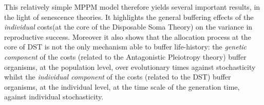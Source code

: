 \documentclass[10pt,a4paper]{article}
\newcommand{\PCoR}{\emph{individual} costs}
\begin{document}
This relatively simple MPPM model therefore yields several important results, in the light of senescence theories. It highlights the general buffering effects of the \PCoR (at the core of the Disposable Soma Theory) on the variance in reproductive success. Moreover it also shows that the allocation process at the core of DST is not the only mechanism able to buffer life-history: 
the \emph{genetic component} of the costs (related to the Antagonistic Pleiotropy theory) buffer organisms, at the population level, over evolutionary times against stochasticity whilst the \emph{individual component} of the costs (related to the DST) buffer organisms, at the individual level, at the time scale of the generation time, against individual stochasticity.\\
 
\end{document}
